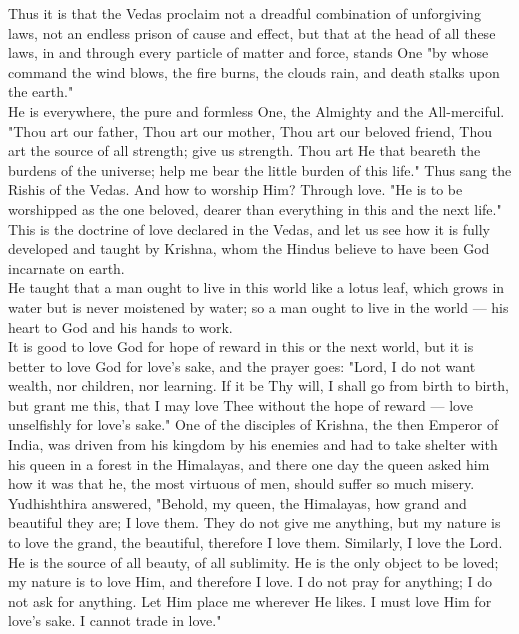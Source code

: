 Thus it is that the Vedas proclaim not a dreadful combination
of unforgiving laws, not an endless prison of cause and effect, but
that at the head of all these laws, in and through every particle of
matter and force, stands One "by whose command the wind blows, the fire
burns, the clouds rain, and death stalks upon the earth."\\

He is everywhere, the pure and formless One, the Almighty and
the All-merciful. "Thou art our father, Thou art our mother, Thou art
our beloved friend, Thou art the source of all strength; give us
strength. Thou art He that beareth the burdens of the universe; help me
bear the little burden of this life." Thus sang the Rishis of the
Vedas. And how to worship Him? Through love. "He is to be worshipped as
the one beloved, dearer than everything in this and the next life."\\

This is the doctrine of love declared in the Vedas, and let us
see how it is fully
developed and taught by Krishna, whom the Hindus believe to have been
God incarnate on
earth.\\

He taught that a man ought to live in this world like a lotus
leaf, which grows in
water but is never moistened by water; so a man ought to live in the
world — his
heart to God and his hands to work.\\

It is good to love God for hope of reward in this or the next
world, but it is
better to love God for love's sake, and the prayer goes: "Lord, I do
not want
wealth, nor children, nor learning. If it be Thy will, I shall go from
birth to birth,
but grant me this, that I may love Thee without the hope of reward —
love
unselfishly for love's sake." One of the disciples of Krishna, the then
Emperor
of India, was driven from his kingdom by his enemies and had to take
shelter with his
queen in a forest in the Himalayas, and there one day the queen asked
him how it was
that he, the most virtuous of men, should suffer so much misery.
Yudhishthira
answered, "Behold, my queen, the Himalayas, how grand and beautiful
they are; I
love them. They do not give me anything, but my nature is to love the
grand, the
beautiful, therefore I love them. Similarly, I love the Lord. He is the
source of
all beauty, of all sublimity. He is the only object to be loved; my
nature is to love
Him, and therefore I love. I do not pray for anything; I do not ask for
anything. Let
Him place me wherever He likes. I must love Him for love's sake. I
cannot trade in
love."\\

